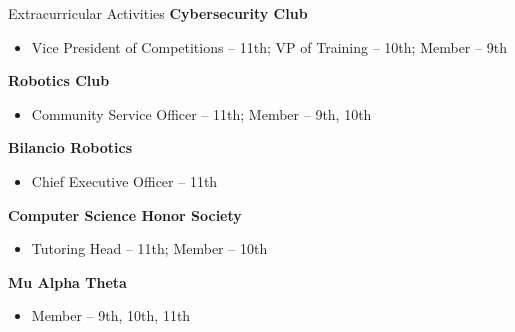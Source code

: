 \begin{resume_section}{Extracurricular Activities}
	\textbf{Cybersecurity Club}

	\vspace*{-0.05in}

	\begin{itemize}
		\setlength{\labelsep}{0.1in}
		\item Vice President of Competitions -- 11th; VP of Training -- 10th; Member -- 9th
	\end{itemize}

	\textbf{Robotics Club}

	\vspace*{-0.05in}

	\begin{itemize}
		\setlength{\labelsep}{0.1in}
		\item Community Service Officer -- 11th; Member -- 9th, 10th
	\end{itemize}

	\textbf{Bilancio Robotics}

	\vspace*{-0.05in}

	\begin{itemize}
		\setlength{\labelsep}{0.1in}
		\item Chief Executive Officer -- 11th
	\end{itemize}

	\textbf{Computer Science Honor Society}

	\vspace*{-0.05in}

	\begin{itemize}
		\setlength{\labelsep}{0.1in}
		\item Tutoring Head -- 11th; Member -- 10th
	\end{itemize}

	\textbf{Mu Alpha Theta}

	\vspace*{-0.05in}

	\begin{itemize}
		\setlength{\labelsep}{0.1in}
		\item Member -- 9th, 10th, 11th
	\end{itemize}
\end{resume_section}

\bigskip

